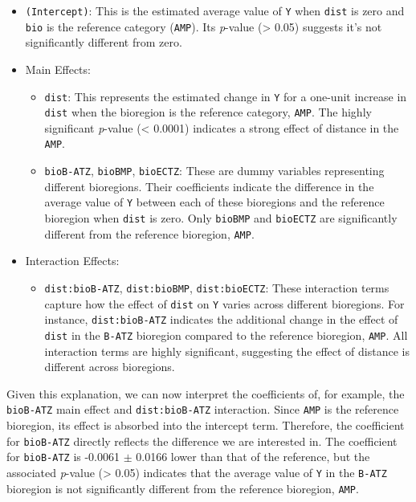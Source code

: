 \documentclass[
  letterpaper,
]{book}
\providecommand{\tightlist}{%
  \setlength{\itemsep}{0pt}\setlength{\parskip}{0pt}}\usepackage{longtable,booktabs,array}
\begin{document}
\begin{itemize}
\tightlist
\item
  \texttt{(Intercept)}: This is the estimated average value of
  \texttt{Y} when \texttt{dist} is zero and \texttt{bio} is the
  reference category (\texttt{AMP}). Its \emph{p}-value (\textgreater{}
  0.05) suggests it's not significantly different from zero.
\item
  Main Effects:

  \begin{itemize}
  \tightlist
  \item
    \texttt{dist}: This represents the estimated change in \texttt{Y}
    for a one-unit increase in \texttt{dist} when the bioregion is the
    reference category, \texttt{AMP}. The highly significant
    \emph{p}-value (\textless{} 0.0001) indicates a strong effect of
    distance in the \texttt{AMP}.
  \item
    \texttt{bioB-ATZ}, \texttt{bioBMP}, \texttt{bioECTZ}: These are
    dummy variables representing different bioregions. Their
    coefficients indicate the difference in the average value of
    \texttt{Y} between each of these bioregions and the reference
    bioregion when \texttt{dist} is zero. Only \texttt{bioBMP} and
    \texttt{bioECTZ} are significantly different from the reference
    bioregion, \texttt{AMP}.
  \end{itemize}
\item
  Interaction Effects:

  \begin{itemize}
  \tightlist
  \item
    \texttt{dist:bioB-ATZ}, \texttt{dist:bioBMP}, \texttt{dist:bioECTZ}:
    These interaction terms capture how the effect of \texttt{dist} on
    \texttt{Y} varies across different bioregions. For instance,
    \texttt{dist:bioB-ATZ} indicates the additional change in the effect
    of \texttt{dist} in the \texttt{B-ATZ} bioregion compared to the
    reference bioregion, \texttt{AMP}. All interaction terms are highly
    significant, suggesting the effect of distance is different across
    bioregions.
  \end{itemize}
\end{itemize}

Given this explanation, we can now interpret the coefficients of, for
example, the \texttt{bioB-ATZ} main effect and \texttt{dist:bioB-ATZ}
interaction. Since \texttt{AMP} is the reference bioregion, its effect
is absorbed into the intercept term. Therefore, the coefficient for
\texttt{bioB-ATZ} directly reflects the difference we are interested in.
The coefficient for \texttt{bioB-ATZ} is -0.0061 \(\pm\) 0.0166 lower
than that of the reference, but the associated \emph{p}-value
(\textgreater{} 0.05) indicates that the average value of \texttt{Y} in
the \texttt{B-ATZ} bioregion is not significantly different from the
reference bioregion, \texttt{AMP}.
\end{document}
